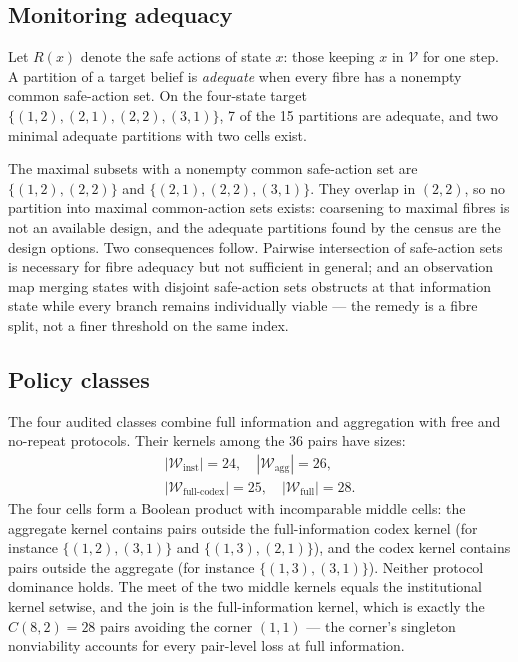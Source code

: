 \documentclass[10pt,twocolumn]{article}
\theoremstyle{definition}
\begin{document}
\subsection{Monitoring adequacy}\label{adequacy}

Let \(R(x)\) denote the safe actions of state \(x\): those keeping
\(x\) in \(\mathcal{V}\) for one step. A partition of a target belief
is \emph{adequate} when every fibre has a nonempty common safe-action
set. On the four-state target
\(\{(1,2), (2,1), (2,2), (3,1)\}\), 7 of the 15 partitions are
adequate, and two minimal adequate partitions with two cells exist.

The maximal subsets with a nonempty common safe-action set are
\(\{(1,2), (2,2)\}\) and \(\{(2,1), (2,2), (3,1)\}\). They overlap in
\((2,2)\), so no partition into maximal common-action sets exists:
coarsening to maximal fibres is not an available design, and the
adequate partitions found by the census are the design options. Two
consequences follow. Pairwise intersection of safe-action sets is
necessary for fibre adequacy but not sufficient in general; and an
observation map merging states with disjoint safe-action sets obstructs
at that information state while every branch remains individually
viable --- the remedy is a fibre split, not a finer threshold on the
same index.

\subsection{Policy classes}\label{classes}

The four audited classes combine full information and aggregation with
free and no-repeat protocols. Their kernels among the 36 pairs have
sizes:
\begin{gather*}
|\mathcal{W}_{\mathrm{inst}}| = 24,\quad
|\mathcal{W}_{\mathrm{agg}}| = 26,\\
|\mathcal{W}_{\mathrm{full\text{-}codex}}| = 25,\quad
|\mathcal{W}_{\mathrm{full}}| = 28 .
\end{gather*}
The four cells form a Boolean product with incomparable middle cells:
the aggregate kernel contains pairs outside the full-information codex
kernel (for instance \(\{(1,2),(3,1)\}\) and \(\{(1,3),(2,1)\}\)), and
the codex kernel contains pairs outside the aggregate (for instance
\(\{(1,3),(3,1)\}\)). Neither protocol dominance holds. The meet of the
two middle kernels equals the institutional kernel setwise, and the
join is the full-information kernel, which is exactly the
\(C(8,2) = 28\) pairs avoiding the corner \((1,1)\) --- the corner's
singleton nonviability accounts for every pair-level loss at full
information.
\end{document}
